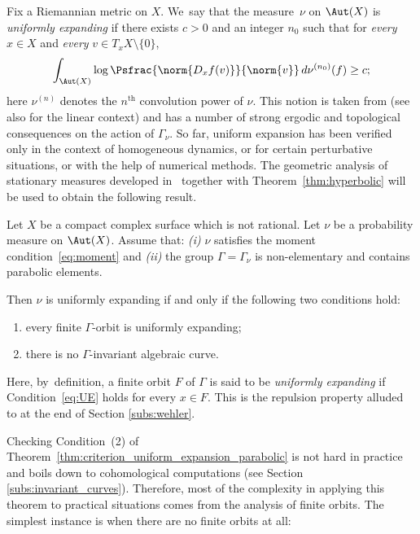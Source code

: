 Fix a Riemannian
metric on $X$. We~say that the measure~$\nu$ on $\Aut(X)$
is \emph{uniformly expanding} if there exists $c>0$ and an integer $n_0$ such that for \emph{every} $x\in X$ and \emph{every} $v\in T_xX\setminus\{ 0\}$,\vspace*{-3pt}\enlargethispage{.5\baselineskip}
\begin{equation}\label{eq:UE}
\int_{\Aut(X)} \log\Psfrac{\norm{D_xf (v)}}{\norm{v}} \,d\nu^{(n_0)}(f) \geq c;
\end{equation}
here $\nu^{(n)}$ denotes the $n^\mathrm{th}$ convolution power of $\nu$.
This notion is taken from
\cite{chung, dolgopyat-krikorian, liu_thesis, zzhang} (see also \cite{Eskin-Lindenstrauss:RandomWalk, Prohaska-Sert:TAMS} for the linear context) and has a number
of strong ergodic and topological consequences on the action of $\Gamma_\nu$.
So far, uniform expansion has been verified only in the context of homogeneous dynamics, or for certain perturbative situations, or with the help of numerical methods.
The geometric analysis of stationary measures developed in~\cite{stiffness} together with Theorem~\ref{thm:hyperbolic}
will be used to obtain the following result.

\begin{thm}\label{thm:criterion_uniform_expansion_parabolic}
Let $X$ be a compact complex surface which is not rational.
Let $\nu$ be a probability measure on $\Aut(X)$. Assume that:
{\em{(i)}} $\nu$ satisfies the moment condition~\eqref{eq:moment} and {\em{(ii)}} the group
$\Gamma = \Gamma_\nu$ is non-elementary and contains parabolic elements.

Then $\nu$ is uniformly expanding if and only if the following two conditions hold:
\begin{enumerate}
\item\label{thm:criterion_uniform_expansion_parabolic1} every finite $\Gamma$-orbit is uniformly expanding;
\item\label{thm:criterion_uniform_expansion_parabolic2} there is no $\Gamma$-invariant algebraic curve.
\end{enumerate}
\end{thm}

Here, by~definition,
a finite orbit $F$ of $\Gamma$ is said to be \emph{uniformly expanding} if Condition~\eqref{eq:UE}
holds for every $x\in F$. This is the repulsion property alluded to at the end of Section \ref{subs:wehler}.

Checking Condition~(2)
of Theorem~\ref{thm:criterion_uniform_expansion_parabolic} is not hard in practice and boils down to cohomological computations
(see Section \ref{subs:invariant_curves}). Therefore, most of the complexity in applying this theorem to practical situations
comes from the analysis of finite orbits. The simplest instance is when there are no finite orbits at all:

